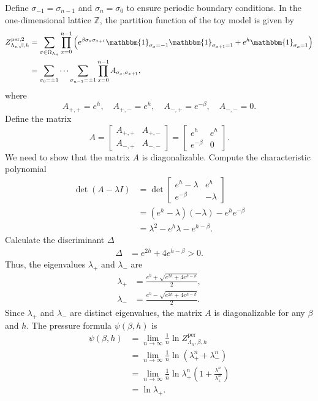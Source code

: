 \documentclass[11pt]{book}
\begin{document}
Define $\sigma_{-1} = \sigma_{n-1}$ and $\sigma_n = \sigma_0$ to ensure periodic boundary conditions. In the one-dimensional lattice $\mathbb{Z}$, the partition function of the toy model is given by
\begin{equation}\label{partition_function_tm2}
\begin{aligned}
Z^{\text{per,2}}_{\Lambda_n,\beta,h}  
&= \sum_{\sigma \in \Omega_{\Lambda_n}} \prod_{x=0}^{n-1} \left( e^{\beta \sigma_{x}\sigma_{x+1}} \mathbbm{1}_{\sigma_x = -1} \mathbbm{1}_{\sigma_{x+1} = 1} + e^{h} \mathbbm{1}_{\sigma_x = 1} \right) \\
&= \sum_{\sigma_0=\pm 1} \cdots \sum_{\sigma_{n-1}=\pm 1} \prod_{x=0}^{n-1} A_{\sigma_x,\sigma_{x+1}},
\end{aligned}
\end{equation}
where
\[
A_{+,+} = e^h, \quad A_{+,-} = e^h, \quad A_{-,+} = e^{-\beta}, \quad A_{-,-} = 0.
\]
Define the matrix
\[
A = \begin{bmatrix}
A_{+,+} & A_{+,-} \\
A_{-,+} & A_{-,-}
\end{bmatrix} = \begin{bmatrix}
e^h & e^h \\
e^{-\beta} & 0
\end{bmatrix}.
\]
We need to show that the matrix $A$ is diagonalizable. Compute the characteristic polynomial
\begin{align*}
\det(A - \lambda I) &= \det\begin{bmatrix}
e^h - \lambda & e^h \\
e^{-\beta} & -\lambda
\end{bmatrix} \\
&= (e^h - \lambda)(-\lambda) - e^h e^{-\beta} \\
&= \lambda^2 - e^h \lambda - e^{h - \beta}.
\end{align*}
Calculate the discriminant $\Delta$
\begin{align*}
\Delta &= e^{2h} + 4 e^{h - \beta} > 0.
\end{align*}
Thus, the eigenvalues $\lambda_+$ and $\lambda_-$ are
\begin{align*}
\lambda_+ &= \frac{e^h + \sqrt{e^{2h} + 4 e^{h - \beta}}}{2}, \\
\lambda_- &= \frac{e^h - \sqrt{e^{2h} + 4 e^{h - \beta}}}{2}.
\end{align*}
Since $\lambda_+$ and $\lambda_-$ are distinct eigenvalues, the matrix $A$ is diagonalizable for any $\beta$ and $h$.
The pressure formula $\psi(\beta,h)$ is
\begin{align*}
\psi(\beta,h) &= \lim_{n \to \infty} \frac{1}{n} \ln Z^{\text{per}}_{\Lambda_n,\beta,h} \\
&= \lim_{n \to \infty} \frac{1}{n} \ln \left( \lambda_+^n + \lambda_-^n \right) \\
&= \lim_{n \to \infty} \frac{1}{n} \ln \lambda_+^n \left(1 + \frac{\lambda_-^n}{\lambda_+^n} \right) \\
&= \ln \lambda_+.
\end{align*}
\end{document}
